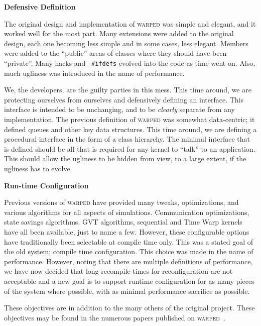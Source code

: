 \documentclass[11pt]{article}
\begin{document}
\begin{description}

\item \textbf{Defensive Definition} 
  
  The original design and implementation of \textsc{warped} was simple and
  elegant, and it worked well for the most part.  Many extensions were
  added to the original design, each one becoming less simple and in some
  cases, less elegant.  Members were added to the ``public'' areas of
  classes where they should have been ``private''.  Many hacks and {\tt
  \#ifdefs} evolved into the code as time went on.  Also, much ugliness
  was introduced in the name of performance.

  We, the developers, are the guilty parties in this mess.  This time
  around, we are protecting ourselves from ourselves and defensively
  defining an interface. This interface is intended to be unchanging, and
  to be \emph{clearly} separate from any implementation.  The previous
  definition of \textsc{warped} was somewhat data-centric; it defined
  queues and other key data structures.  This time around, we are defining
  a procedural interface in the form of a class hierarchy.  The minimal
  interface that is defined should be all that is required for any kernel
  to ``talk'' to an application.  This should allow the ugliness to be
  hidden from view, to a large extent, if the ugliness has to evolve.

\item \textbf{Run-time Configuration}

  Previous versions of \textsc{warped} have provided many tweaks,
  optimizations, and various algorithms for all aspects of simulations.
  Communication optimizations, state savings algorithms, GVT algorithms,
  sequential and Time Warp kernels have all been available, just to name a
  few.  However, these configurable options have traditionally been
  selectable at compile time only.  This was a stated goal of the old
  system; compile time configuration.  This choice was made in the name of
  performance.  However, noting that there are multiple definitions of
  performance, we have now decided that long recompile times for
  reconfiguration are not acceptable and a new goal is to support runtime
  configuration for as many pieces of the system where possible, with as
  minimal performance sacrifice as possible.

\end{description}

These objectives are in addition to the many others of the original
project.  These objectives may be found in the numerous papers published on
\textsc{warped}~\cite{martin-96,ramanan-98-iscope,ramanan-96}.
\end{document}
